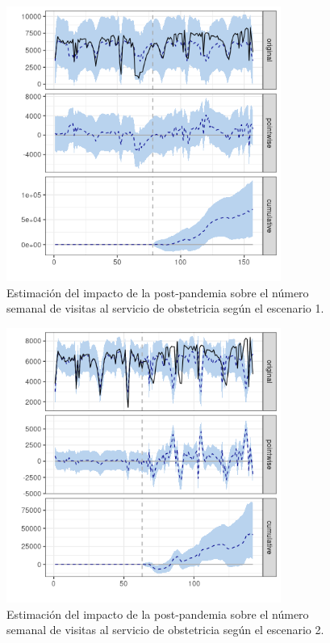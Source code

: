 \documentclass[12pt,twoside]{article} %
\begin{document}
  \begin{center}
  \begin{figure}[H]
  \includegraphics[width=9cm]{obstetrics_post_scen1.png}\caption{Estimación del impacto de la post-pandemia sobre el número semanal de visitas al servicio de obstetricia según el escenario 1.}
  \end{figure}
  \end{center}
  
  \begin{center}
    \begin{figure}[H]
      \includegraphics[width=9cm]{obstetrics_post_scen2.png}\caption{Estimación del impacto de la post-pandemia sobre el número semanal de visitas al servicio de obstetricia según el escenario 2.}
    \end{figure}
    \end{center}
\end{document}
